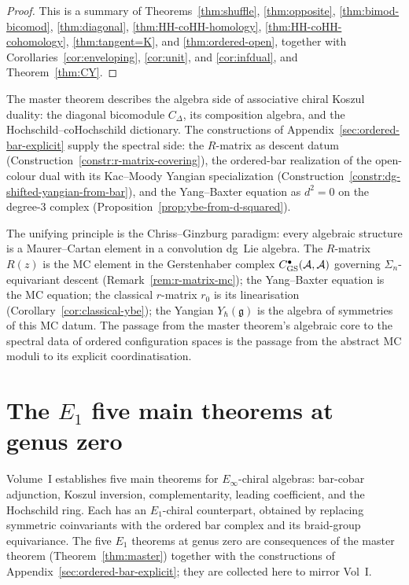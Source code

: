 \begin{proof}
This is a summary of Theorems~\ref{thm:shuffle}, \ref{thm:opposite},
\ref{thm:bimod-bicomod}, \ref{thm:diagonal}, \ref{thm:HH-coHH-homology},
\ref{thm:HH-coHH-cohomology}, \ref{thm:tangent=K}, and \ref{thm:ordered-open}, together with
Corollaries~\ref{cor:enveloping}, \ref{cor:unit}, and \ref{cor:infdual}, and
Theorem~\ref{thm:CY}.
\end{proof}

\begin{remark}
\label{rem:chriss-ginzburg-architecture}
The master theorem describes the algebra side of associative chiral
Koszul duality: the diagonal bicomodule $C_\Delta$, its composition
algebra, and the Hochschild--coHochschild dictionary. The
constructions of Appendix~\ref{sec:ordered-bar-explicit} supply the
spectral side: the $R$-matrix as descent datum
(Construction~\ref{constr:r-matrix-covering}), the ordered-bar
realization of the open-colour dual with its Kac--Moody Yangian
specialization
(Construction~\ref{constr:dg-shifted-yangian-from-bar}), and the
Yang--Baxter equation as $d^2=0$ on the degree-$3$ complex
(Proposition~\ref{prop:ybe-from-d-squared}).

The unifying principle is the Chriss--Ginzburg paradigm: every
algebraic structure is a Maurer--Cartan element in a convolution
dg~Lie algebra. The $R$-matrix $R(z)$ is the MC element in the
Gerstenhaber complex $C^\bullet_{\mathrm{GS}}(\mathcal{A},\mathcal{A})$ governing
$\Sigma_n$-equivariant descent (Remark~\ref{rem:r-matrix-mc}); the
Yang--Baxter equation is the MC equation; the classical $r$-matrix
$r_0$ is its linearisation (Corollary~\ref{cor:classical-ybe}); the
Yangian $Y_\hbar(\mathfrak g)$ is the algebra of symmetries of this
MC datum. The passage from the master theorem's algebraic core to
the spectral data of ordered configuration spaces is the passage
from the abstract MC moduli to its explicit coordinatisation.
\end{remark}

\section{The \texorpdfstring{$E_1$}{E1} five main theorems at genus zero}
\label{sec:e1-five-theorems-genus0}

Volume~I establishes five main theorems for $E_\infty$-chiral
algebras: bar-cobar adjunction, Koszul inversion, complementarity,
leading coefficient, and the Hochschild ring. Each has an
$E_1$-chiral counterpart, obtained by replacing symmetric
coinvariants with the ordered bar complex and its braid-group
equivariance. The five $E_1$ theorems at genus zero are consequences
of the master theorem (Theorem~\ref{thm:master}) together with the
constructions of Appendix~\ref{sec:ordered-bar-explicit}; they are
collected here to mirror Vol~I.

